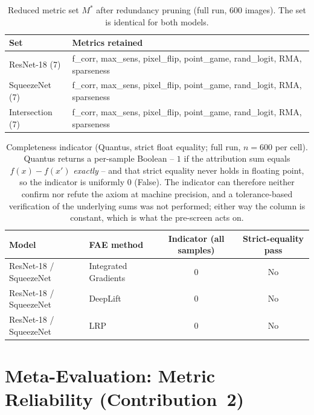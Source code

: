 \begin{table}[H]
\centering
\caption{Reduced metric set $M^{*}$ after redundancy pruning (full run, 600
images). The set is identical for both models.}
\begin{tabularx}{\linewidth}{lX}
\toprule
Set & Metrics retained \\
\midrule
ResNet-18 (7)     & f\_corr, max\_sens, pixel\_flip, point\_game, rand\_logit, RMA, sparseness \\
SqueezeNet (7)    & f\_corr, max\_sens, pixel\_flip, point\_game, rand\_logit, RMA, sparseness \\
Intersection (7)  & f\_corr, max\_sens, pixel\_flip, point\_game, rand\_logit, RMA, sparseness \\
\bottomrule
\end{tabularx}
\label{tab:mstar}
\end{table}

\begin{table}[H]
\centering
\caption{Completeness indicator (Quantus, strict float equality; full run,
$n = 600$ per cell). Quantus returns a per-sample Boolean -- $1$ if the
attribution sum equals $f(x) - f(x')$ \emph{exactly} -- and that strict
equality never holds in floating point, so the indicator is uniformly
$0$ (False). The indicator can therefore neither confirm nor refute the
axiom at machine precision, and a tolerance-based verification of the
underlying sums was not performed; either way the column is constant,
which is what the pre-screen acts on.}
\begin{tabularx}{\linewidth}{llcc}
\toprule
Model & FAE method & Indicator (all samples) & Strict-equality pass \\
\midrule
ResNet-18 / SqueezeNet & Integrated Gradients & 0 & No \\
ResNet-18 / SqueezeNet & DeepLift             & 0 & No \\
ResNet-18 / SqueezeNet & LRP                  & 0 & No \\
\bottomrule
\end{tabularx}
\label{tab:axiom}
\end{table}

\section{Meta-Evaluation: Metric Reliability (Contribution~2)}
\label{sec:exp-meta}

